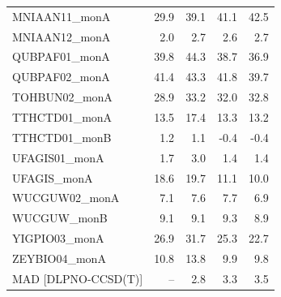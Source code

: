 \begin{longtable}{lrrrr}
MNIAAN11\_monA & 29.9 & 39.1 & 41.1 & 42.5 \\
MNIAAN12\_monA & 2.0 & 2.7 & 2.6 & 2.7 \\
QUBPAF01\_monA & 39.8 & 44.3 & 38.7 & 36.9 \\
QUBPAF02\_monA & 41.4 & 43.3 & 41.8 & 39.7 \\
TOHBUN02\_monA & 28.9 & 33.2 & 32.0 & 32.8 \\
TTHCTD01\_monA & 13.5 & 17.4 & 13.3 & 13.2 \\
TTHCTD01\_monB & 1.2 & 1.1 & -0.4 & -0.4 \\
UFAGIS01\_monA & 1.7 & 3.0 & 1.4 & 1.4 \\
UFAGIS\_monA & 18.6 & 19.7 & 11.1 & 10.0 \\
WUCGUW02\_monA & 7.1 & 7.6 & 7.7 & 6.9 \\
WUCGUW\_monB & 9.1 & 9.1 & 9.3 & 8.9 \\
YIGPIO03\_monA & 26.9 & 31.7 & 25.3 & 22.7 \\
ZEYBIO04\_monA & 10.8 & 13.8 & 9.9 & 9.8 \\
MAD [DLPNO-CCSD(T)] & -- & 2.8 & 3.3 & 3.5 \\
\bottomrule


\end{longtable}